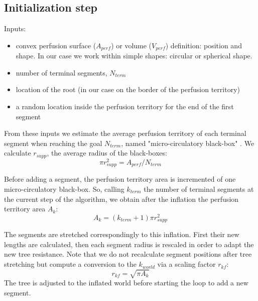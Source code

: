 \documentclass[a4paper, 11pt]{article} %
\begin{document}
\subsection{Initialization step}  
Inputs:
\begin{itemize}
\item convex perfusion surface ($A_{perf}$) or volume ($V_{perf}$) definition: position and shape. In our case we work within simple shapes: circular or spherical shape.
\item number of terminal segments, $N_{term}$
\item location of the root (in our case on the border of the perfusion territory)
\item a random location inside the perfusion territory for the end of the first segment 
\end{itemize}

From these inputs we estimate the average perfusion territory of each terminal segment when reaching the goal $N_{term}$, named "micro-circulatory black-box" \cite{schreiner1993computer}. We calculate $r_{supp}$, the average radius of the black-boxes:
\begin{equation}
\pi r_{supp}^2 = A_{perf} / N_{term}
\label{eq rsupp2D}
\end{equation}  

Before adding a segment, the perfusion territory area is incremented of one micro-circulatory black-box. So, calling $k_{term}$ the number of terminal segments at the current step of the algorithm, we obtain after the inflation the perfusion territory area $A_k$:
\begin{equation}
A_k = (k_{term} + 1) \pi r_{supp}^2
\end{equation}

The segments are stretched correspondingly to this inflation. First their new lengths are calculated, then each segment radius is rescaled in order to adapt the new tree resistance. 
Note that we do not recalculate segment positions after tree stretching but compute a conversion to the $k_{world}$ via a scaling factor $r_{kf}$:
\begin{equation}
r_{kf} = \sqrt{\pi A_k}
\end{equation}   
The tree is adjusted to the inflated world before starting the loop to add a new segment.
\end{document}
